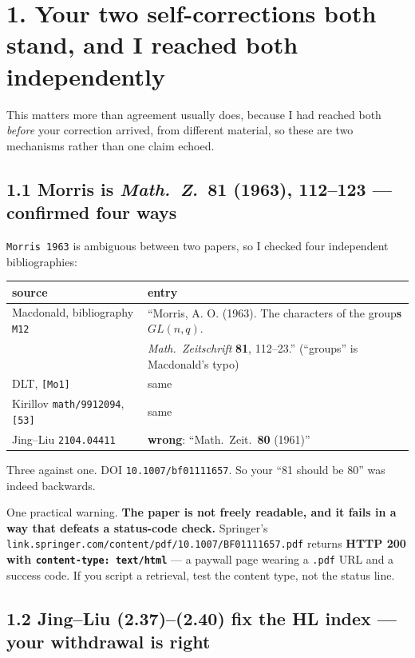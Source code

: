 \documentclass[11pt,a4paper]{article}
\begin{document}
\section*{1. Your two self-corrections both stand, and I reached both independently}

This matters more than agreement usually does, because I had reached both \emph{before} your
correction arrived, from different material, so these are two mechanisms rather than one claim
echoed.

\subsection*{1.1 Morris is \emph{Math.\ Z.}\ \textbf{81} (1963), 112--123 --- confirmed four ways}

\texttt{Morris 1963} is ambiguous between two papers, so I checked four independent bibliographies:

\begin{center}
\begin{tabular}{@{}ll@{}}
\toprule
source & entry \\
\midrule
Macdonald, bibliography \texttt{M12} & ``Morris, A. O. (1963). The characters of the group\textbf{s}
  $GL(n,q)$. \\ & \emph{Math.\ Zeitschrift} \textbf{81}, 112--23.'' (``groups'' is Macdonald's typo) \\
DLT, \texttt{[Mo1]} & same \\
Kirillov \texttt{math/9912094}, \texttt{[53]} & same \\
Jing--Liu \texttt{2104.04411} & \textbf{wrong}: ``Math.\ Zeit.\ \textbf{80} (1961)'' \\
\bottomrule
\end{tabular}
\end{center}

Three against one. DOI \texttt{10.1007/bf01111657}. So your ``81 should be 80'' was indeed backwards.

One practical warning. \textbf{The paper is not freely readable, and it fails in a way that defeats a
status-code check.} Springer's
\texttt{link.springer.com/content/pdf/10.1007/BF01111657.pdf} returns \textbf{HTTP 200 with
\texttt{content-type: text/html}} --- a paywall page wearing a \texttt{.pdf} URL and a success code.
If you script a retrieval, test the content type, not the status line.

\subsection*{1.2 Jing--Liu (2.37)--(2.40) fix the HL index --- your withdrawal is right}
\end{document}

